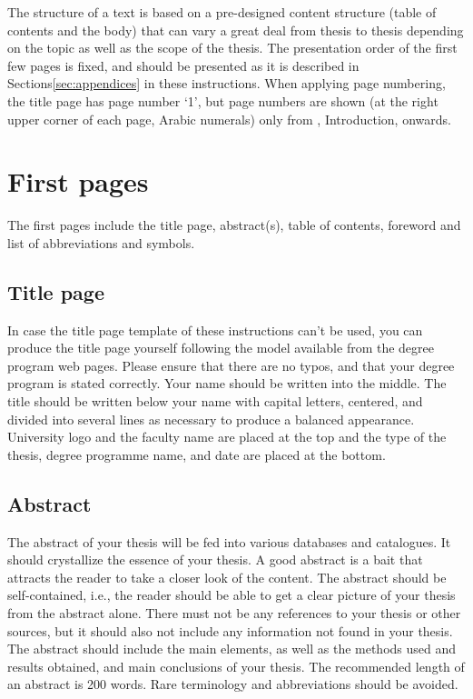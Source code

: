 
The structure of a text is based on a pre-designed content structure (table of contents and the body) that can vary a great deal from thesis to thesis depending on the topic as well as the scope of the thesis. The presentation order of the first few pages is fixed, and should be presented as it is described in Sections\DIFdelbegin {}\DIFdelend \DIFaddbegin {}\DIFaddend \ref{sec:appendices} in these instructions. When applying page numbering, the title page has page number ‘1’, but page numbers are shown (at the right upper corner of each page, Arabic numerals) only from , Introduction, onwards.

\section{First pages}
\label{sec:first_pages}
The first pages include the title page, abstract(s), table of contents, foreword and list of abbreviations and symbols. 

\subsection{Title page}

In case the title page template of these instructions can't be used, you can produce the title page yourself following the model available from the degree program web pages. Please ensure that there are no typos, and that your degree program is stated correctly. Your name should be written into the middle. The title should be written below your name with capital letters, centered, and divided into several lines as necessary to produce a balanced appearance. University logo and the faculty name are placed at the top and the type of the thesis, degree programme name, and date are placed at the bottom.

\subsection{Abstract}

The abstract of your thesis will be fed into various databases and catalogues. It should crystallize the essence of your thesis. A good abstract is a bait that attracts the reader to take a closer look of the content. The abstract should be self-contained, i.e., the reader should be able to get a clear picture of your thesis from the abstract alone. There must not be any references to your thesis or other sources, but it should also not include any information not found in your thesis. The abstract should include the main elements, as well as the methods used and results obtained, and main conclusions of your thesis. The recommended length of an abstract is 200 words. Rare terminology and abbreviations should be avoided. 


